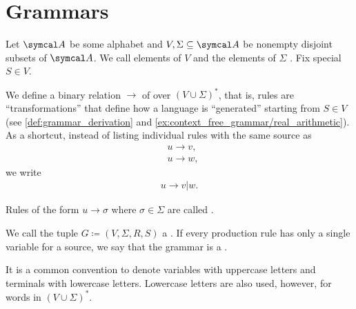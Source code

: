 \section{Grammars}\label{sec:grammars}

\begin{definition}\label{def:grammar}\cite[definition 2.2]{Sipser2013}
  Let \( \Cal{A} \) be some alphabet and \( V, \Sigma \subseteq \Cal{A} \) be nonempty disjoint subsets of \( \Cal{A} \). We call elements of \( V \)  and the elements of \( \Sigma \) . Fix special  \( S \in V \).

  We define a binary relation \( \to \) of  over \( (V \cup \Sigma)^* \), that is, rules are \enquote{transformations} that define how a language is \enquote{generated} starting from \( S \in V \) (see \cref{def:grammar_derivation} and \cref{ex:context_free_grammar/real_arithmetic}). As a shortcut, instead of listing individual rules with the same source as
  \begin{align*}
    &u \to v, \\
    &u \to w,
  \end{align*}
  we write
  \begin{align*}
    u \to v | w.
  \end{align*}

  Rules of the form \( u \to \sigma \) where \( \sigma \in \Sigma \) are called .

  We call the tuple \( G \coloneqq (V, \Sigma, R, S) \) a . If every production rule has only a single variable for a source, we say that the grammar is a .
\end{definition}

\begin{note}\label{note:grammar_symbol_case}
  It is a common convention to denote variables with uppercase letters and terminals with lowercase letters. Lowercase letters are also used, however, for words in \( (V \cup \Sigma)^* \).
\end{note}

